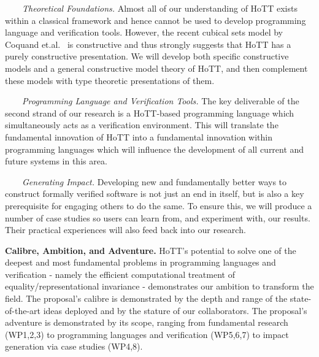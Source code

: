 \documentclass[a4paper,11pt]{article}
\begin{document}



$\;\;\; \;\;\;$ {\em Theoretical Foundations.} Almost all of our
understanding of HoTT exists within a classical framework and hence
cannot be used to develop programming language and verification
tools. However, the recent cubical sets model by Coquand
et.al.~\cite{BezemM:cubsmt} is constructive and thus strongly suggests
that HoTT has a
purely constructive presentation. We will develop
both specific constructive 
models 
and a general constructive model theory 
of HoTT, and then complement these models with type theoretic
presentations of them.

$\;\;\;\;\;\;$ {\em Programming Language and Verification Tools.} The key
  deliverable of the second strand of our research is a HoTT-based
  programming language which simultaneously acts as a verification
  environment. This will translate the fundamental innovation of HoTT
  into a fundamental innovation within programming languages
  which will influence
  the development of all current and future systems in this area.

$\;\;\;\;\;\;$ {\em Generating Impact.} Developing new and fundamentally
  better ways to construct formally verified software is not just an
  end in itself, but is also a key prerequisite for engaging others to
  do the same.  To ensure this, we will produce a number of case studies so
  users can learn from, and experiment with, our results. Their
  practical experiences will also feed back into our research.

  {\bf Calibre, Ambition, and Adventure.} HoTT's potential to
  solve one of the deepest and most fundamental problems in
  programming languages and verification - namely the efficient
  computational treatment of equality/representational invariance -
  demonstrates our ambition to transform the field. The proposal's calibre is demonstrated by
  the depth and range of the state-of-the-art ideas deployed and by the
  stature of our collaborators. The
  proposal's adventure is demonstrated by its scope, ranging from
  fundamental research (WP1,2,3) to programming languages and
  verification (WP5,6,7) to impact generation via case studies
  (WP4,8).
\end{document}

